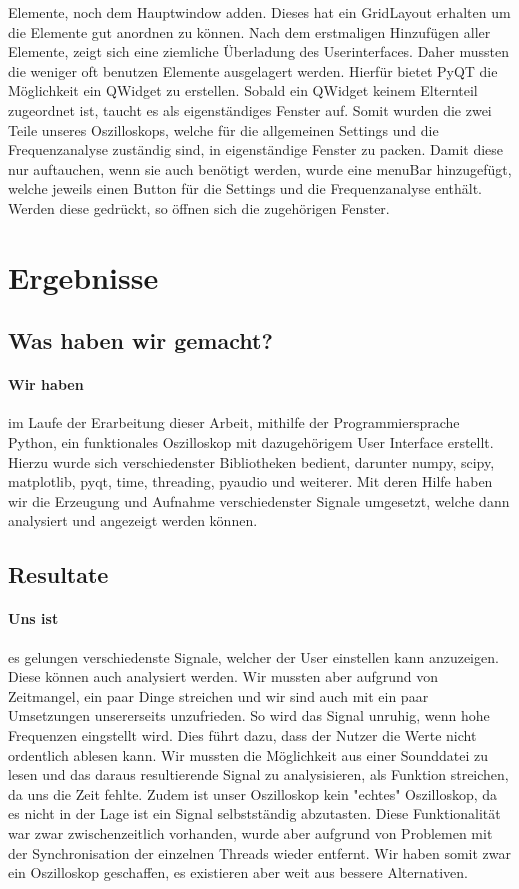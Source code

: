 \documentclass{article}
\begin{document}
Elemente, noch dem Hauptwindow adden. Dieses hat ein GridLayout erhalten um die Elemente gut anordnen zu können. Nach dem erstmaligen Hinzufügen aller Elemente, zeigt sich eine ziemliche Überladung des Userinterfaces. Daher mussten die weniger oft benutzen Elemente ausgelagert werden. Hierfür bietet PyQT die Möglichkeit ein QWidget zu erstellen. Sobald ein QWidget keinem Elternteil zugeordnet ist, taucht es als eigenständiges Fenster auf. Somit wurden die zwei Teile unseres Oszilloskops, welche für die allgemeinen Settings und die Frequenzanalyse zuständig sind, in eigenständige Fenster zu packen. Damit diese nur auftauchen, wenn sie auch benötigt werden, wurde eine menuBar hinzugefügt, welche jeweils einen Button für die Settings und die Frequenzanalyse enthält. Werden diese gedrückt, so öffnen sich die zugehörigen Fenster.

\section{Ergebnisse}
\subsection{Was haben wir gemacht?}
\paragraph{Wir haben} im Laufe der Erarbeitung dieser Arbeit, mithilfe der Programmiersprache Python, ein funktionales Oszilloskop mit dazugehörigem User Interface erstellt. Hierzu wurde sich verschiedenster Bibliotheken bedient, darunter numpy, scipy, matplotlib, pyqt, time, threading, pyaudio und weiterer. Mit deren Hilfe haben wir die Erzeugung und Aufnahme verschiedenster Signale umgesetzt, welche dann analysiert und angezeigt werden können.

\subsection{Resultate}
\paragraph{Uns ist}
es gelungen verschiedenste Signale, welcher der User einstellen kann anzuzeigen. Diese können auch analysiert werden. Wir mussten aber aufgrund von Zeitmangel, ein paar Dinge streichen und wir sind auch mit ein paar Umsetzungen unsererseits unzufrieden. So wird das Signal unruhig, wenn hohe Frequenzen eingstellt wird. Dies führt dazu, dass der Nutzer die Werte nicht ordentlich ablesen kann. Wir mussten die Möglichkeit aus einer Sounddatei zu lesen und das daraus resultierende Signal zu analysisieren, als Funktion streichen, da uns die Zeit fehlte.
Zudem ist unser Oszilloskop kein "echtes" Oszilloskop, da es nicht in der Lage ist ein Signal selbstständig abzutasten. Diese Funktionalität war zwar zwischenzeitlich vorhanden, wurde aber aufgrund von Problemen mit der Synchronisation der einzelnen Threads wieder entfernt. Wir haben somit zwar ein Oszilloskop geschaffen, es existieren aber weit aus bessere Alternativen.
\end{document}
